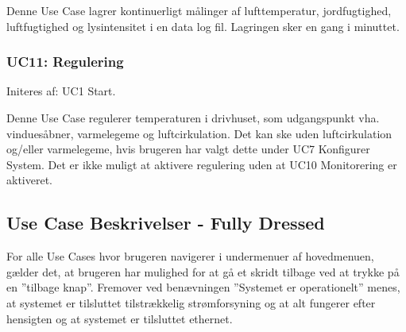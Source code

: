 Denne Use Case lagrer kontinuerligt målinger af lufttemperatur, jordfugtighed, luftfugtighed og lysintensitet i en data log fil. 
Lagringen sker en gang i minuttet. 

\subsubsection{UC11: Regulering}
Initeres af: UC1 Start.

Denne Use Case regulerer temperaturen i drivhuset, som udgangspunkt vha. vinduesåbner, varmelegeme og luftcirkulation. 
Det kan ske uden luftcirkulation og/eller varmelegeme, hvis brugeren har valgt dette under UC7 Konfigurer System. Det er ikke muligt at aktivere regulering uden at UC10 Monitorering er aktiveret.

\clearpage

\subsection{Use Case Beskrivelser - Fully Dressed}
For alle Use Cases hvor brugeren navigerer i undermenuer af hovedmenuen, gælder det, at brugeren har mulighed for at gå et skridt tilbage ved at trykke på en ”tilbage knap”. Fremover ved benævningen ”Systemet er operationelt” menes, at systemet er tilsluttet tilstrækkelig strømforsyning og at alt fungerer efter hensigten og at systemet er tilsluttet ethernet.

